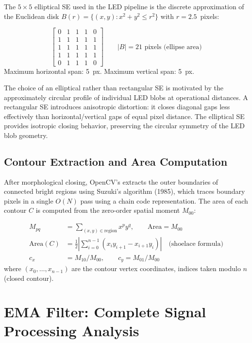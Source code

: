 The $5\times5$ elliptical SE used in the LED pipeline is the discrete approximation of the Euclidean disk $B(r) = \{(x,y): x^2+y^2 \leq r^2\}$ with $r=2.5$~pixels:

\begin{eqblock}
$$
\begin{bmatrix}
0&1&1&1&0\\ 1&1&1&1&1\\ 1&1&1&1&1\\ 1&1&1&1&1\\ 0&1&1&1&0
\end{bmatrix}
\qquad |B| = 21 \text{ pixels (ellipse area)}
$$
Maximum horizontal span: 5~px. Maximum vertical span: 5~px.
\end{eqblock}

The choice of an elliptical rather than rectangular SE is motivated by the approximately circular profile of individual LED blobs at operational distances. A rectangular SE introduces anisotropic distortion: it closes diagonal gaps less effectively than horizontal/vertical gaps of equal pixel distance. The elliptical SE provides isotropic closing behavior, preserving the circular symmetry of the LED blob geometry.

\subsection{Contour Extraction and Area Computation}

After morphological closing, OpenCV's  extracts the outer boundaries of connected bright regions using Suzuki's algorithm (1985), which traces boundary pixels in a single $O(N)$ pass using a chain code representation. The area of each contour $C$ is computed from the zero-order spatial moment $M_{00}$:

\begin{eqblock}
\begin{align}
M_{pq} &= \sum_{(x,y)\in\text{region}} x^p y^q, \qquad \text{Area} = M_{00} \\
\text{Area}(C) &= \frac{1}{2}\left|\sum_{i=0}^{n-1} (x_i y_{i+1} - x_{i+1} y_i)\right| \quad \text{(shoelace formula)} \\
c_x &= M_{10}/M_{00}, \qquad c_y = M_{01}/M_{00}
\end{align}
where $(x_0,\dots,x_{n-1})$ are the contour vertex coordinates, indices taken modulo $n$ (closed contour).
\end{eqblock}

\section{EMA Filter: Complete Signal Processing Analysis}

